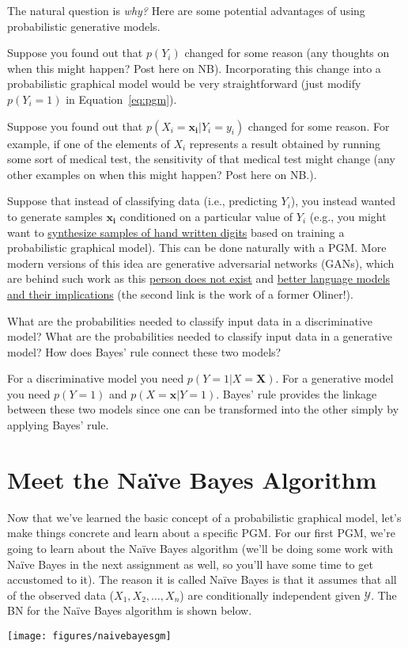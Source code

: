 \documentclass[assignment02_Solutions]{subfiles}
\begin{document}
The natural question is \emph{why?} Here are some potential advantages of using probabilistic generative models.
\bi
\item Suppose you found out that $p(Y_i)$ changed for some reason (any thoughts on when this might happen?  Post here on NB).  Incorporating this change into a probabilistic graphical model would be very straightforward (just modify $p(Y_i =1)$ in Equation~\ref{eq:pgm}).
\item Suppose you found out that $p(X_i  = \mathbf{x_i} | Y_i = y_i)$ changed for some reason.  For example, if one of the elements of $X_i$ represents a result obtained by running some sort of medical test, the sensitivity of that medical test might change (any other examples on when this might happen? Post here on NB.).
\item Suppose that instead of classifying data (i.e., predicting $Y_i$), you instead wanted to generate samples $\mathbf{x_i}$ conditioned on a particular value of $Y_i$ (e.g., you might want to \href{https://www.youtube.com/watch?v=LzE1fF0_3q0}{synthesize samples of hand written digits} based on training a probabilistic graphical model).  This can be done naturally with a PGM.  More modern versions of this idea are generative adversarial networks (GANs), which are behind such work as this \href{https://thispersondoesnotexist.com/}{person does not exist} and \href{https://openai.com/blog/better-language-models/}{better language models and their implications} (the second link is the work of a former Oliner!).
\ei

\begin{understandingcheck}
What are the probabilities needed to classify input data in a discriminative model?  What are the probabilities needed to classify input data in a generative model?  How does Bayes' rule connect these two models?

\begin{boxedsolution}
For a discriminative model you need $p(Y=1 | X = \mathbf{X})$.  For a generative model you need $p(Y=1)$ and $p(X = \mathbf{x} | Y=1)$.  Bayes' rule provides the linkage between these two models since one can be transformed into the other simply by applying Bayes' rule.
\end{boxedsolution}
\end{understandingcheck}


\section{Meet the Na\"ive Bayes Algorithm}
Now that we've learned the basic concept of a probabilistic graphical model, let's make things concrete and learn about a specific PGM.  For our first PGM, we're going to learn about the Na\"ive Bayes algorithm (we'll be doing some work with Na\"ive Bayes in the next assignment as well, so you'll have some time to get accustomed to it).  The reason it is called Na\"ive Bayes is that it assumes that all of the observed data ($X_1, X_2, \ldots, X_n$) are conditionally independent given $\mathcal{Y}$.  The BN for the Na\"ive Bayes algorithm is shown below.
\begin{center}
\texttt{[image: figures/naivebayesgm]}
\end{center}
\end{document}
